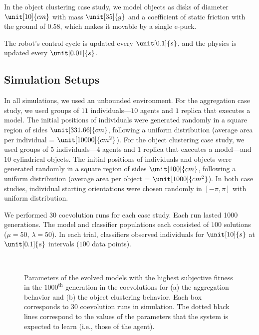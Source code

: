 In the object clustering case study, we model objects as disks of diameter $\unit[10]{cm}$ with mass $\unit[35]{g}$ and a coefficient of static friction with the ground of $0.58$, which makes it movable by a single e-puck.

The robot's control cycle is updated every $\unit[0.1]{s}$, and the physics is updated every $\unit[0.01]{s}$.

\subsection{Simulation Setups}\label{sec:setup_swarm_simulation}

In all simulations, we used an unbounded environment. For the aggregation case study, we used groups of $11$ individuals---$10$ agents and $1$ replica that executes a model. The initial positions of individuals were generated randomly in a square region of sides $\unit[331.66]{cm}$, following a uniform distribution (average area per individual = $\unit[10000]{cm^2}$). For the object clustering case study, we used groups of $5$ individuals---$4$ agents and $1$ replica that executes a model---and $10$ cylindrical objects. The initial positions of individuals and objects were generated randomly in a square region of sides $\unit[100]{cm}$, following a uniform distribution (average area per object = $\unit[1000]{cm^2}$). In both case studies, individual starting orientations were chosen randomly in $[-\pi,\pi]$ with uniform distribution. %

We performed 30 coevolution runs for each case study. Each run lasted 1000 generations. The model and classifier populations each consisted of $100$ solutions ($\mu = 50$,  $\lambda = 50$). In each trial, classifiers observed individuals for $\unit[10]{s}$ at $\unit[0.1]{s}$ intervals ($100$ data points). 

\begin{figure}[!t]%
	\centering
		\\
		\caption{Parameters of the evolved models with the highest subjective fitness in the $1000^\textrm{th}$ generation in the coevolutions for (a) the aggregation behavior and (b) the object clustering behavior. Each box corresponds to 30 coevolution runs in simulation. The dotted black lines correspond to the values of the parameters that the system is expected to learn (i.e., those of the agent).\label{fig:model_parameters_box}}
\end{figure}
%

